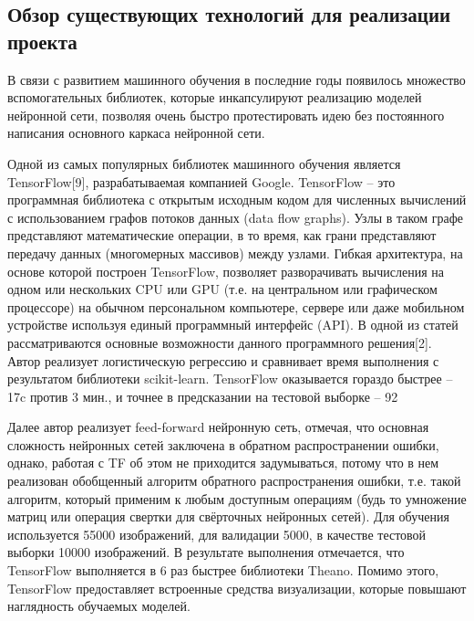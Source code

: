 \subsection{Обзор существующих технологий для реализации проекта}
В связи с развитием машинного обучения в последние годы появилось множество вспомогательных библиотек, которые инкапсулируют реализацию моделей нейронной сети, позволяя очень быстро протестировать идею без постоянного написания основного каркаса нейронной сети.

Одной из самых популярных библиотек машинного обучения является TensorFlow[9], разрабатываемая компанией Google. TensorFlow – это программная библиотека с открытым исходным кодом для численных вычислений с использованием графов потоков данных (data flow graphs). Узлы в таком графе представляют математические операции, в то время, как грани представляют передачу данных (многомерных массивов) между узлами. Гибкая архитектура, на основе которой построен TensorFlow, позволяет разворачивать вычисления на одном или нескольких CPU или GPU (т.е. на центральном или графическом процессоре) на обычном персональном компьютере, сервере или даже мобильном устройстве используя единый программный интерфейс (API).  В одной из статей рассматриваются основные возможности данного программного решения[2]. Автор реализует логистическую регрессию и сравнивает время выполнения с результатом библиотеки scikit-learn. TensorFlow оказывается гораздо быстрее – 17c против 3 мин., и точнее в предсказании на тестовой выборке – 92%

Далее автор реализует feed-forward нейронную сеть, отмечая, что основная сложность нейронных сетей заключена в обратном распространении ошибки, однако, работая с TF об этом не приходится задумываться, потому что в нем реализован обобщенный алгоритм обратного распространения ошибки, т.е. такой алгоритм, который применим к любым доступным операциям (будь то умножение матриц или операция свертки для свёрточных нейронных сетей). Для обучения используется 55000 изображений, для валидации 5000, в качестве тестовой выборки 10000 изображений. В результате выполнения отмечается, что TensorFlow выполняется в 6 раз быстрее библиотеки Theano. Помимо этого, TensorFlow предоставляет встроенные средства визуализации, которые повышают наглядность обучаемых моделей.

